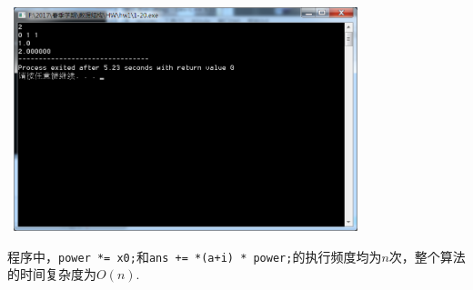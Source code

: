 \documentclass[11pt,a4paper]{ctexart}
\begin{document}
\begin{enumerate}
	\mbox{
		\includegraphics[width=0.75\textwidth]{hw1/screenshot/1-20-quadratic}}
	
	程序中，\texttt{power *= x0;}和\texttt{ans += *(a+i) * power;}的执行频度均为$n$次，整个算法的时间复杂度为$O(n)$.
\end{enumerate}
\newpage
\end{document}
